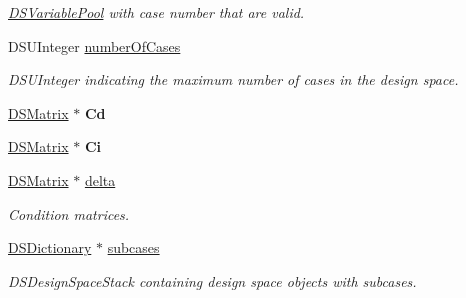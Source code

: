 \begin{DoxyCompactItemize}
\begin{DoxyCompactList}\small\item\em \hyperlink{struct_d_s_variable_pool}{DSVariablePool} with case number that are valid. \item\end{DoxyCompactList}\item 
\hypertarget{struct_d_s_design_space_a13b1ed4c5a74f8af8c169edc3a04d41a}{
DSUInteger \hyperlink{struct_d_s_design_space_a13b1ed4c5a74f8af8c169edc3a04d41a}{numberOfCases}}
\label{struct_d_s_design_space_a13b1ed4c5a74f8af8c169edc3a04d41a}

\begin{DoxyCompactList}\small\item\em DSUInteger indicating the maximum number of cases in the design space. \item\end{DoxyCompactList}\item 
\hypertarget{struct_d_s_design_space_a3f0ef631e7fc4b26d38a5ddb6555cf99}{
\hyperlink{struct_d_s_matrix}{DSMatrix} $\ast$ {\bfseries Cd}}
\label{struct_d_s_design_space_a3f0ef631e7fc4b26d38a5ddb6555cf99}

\item 
\hypertarget{struct_d_s_design_space_abc83f4bb21d43d8bc1f6228d3c66853e}{
\hyperlink{struct_d_s_matrix}{DSMatrix} $\ast$ {\bfseries Ci}}
\label{struct_d_s_design_space_abc83f4bb21d43d8bc1f6228d3c66853e}

\item 
\hypertarget{struct_d_s_design_space_a565e0140e786d762f8a608dcc2e227ef}{
\hyperlink{struct_d_s_matrix}{DSMatrix} $\ast$ \hyperlink{struct_d_s_design_space_a565e0140e786d762f8a608dcc2e227ef}{delta}}
\label{struct_d_s_design_space_a565e0140e786d762f8a608dcc2e227ef}

\begin{DoxyCompactList}\small\item\em Condition matrices. \item\end{DoxyCompactList}\item 
\hypertarget{struct_d_s_design_space_a246cb0cf43ca5193adfd233273c34009}{
\hyperlink{struct_d_s_dictionary}{DSDictionary} $\ast$ \hyperlink{struct_d_s_design_space_a246cb0cf43ca5193adfd233273c34009}{subcases}}
\label{struct_d_s_design_space_a246cb0cf43ca5193adfd233273c34009}

\begin{DoxyCompactList}\small\item\em DSDesignSpaceStack containing design space objects with subcases. \item\end{DoxyCompactList}\end{DoxyCompactItemize}


